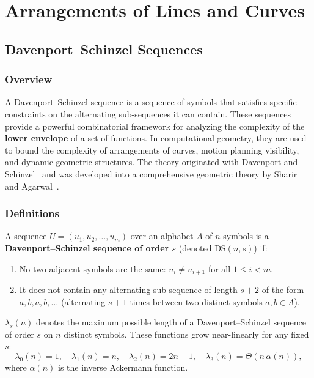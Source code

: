\chapter{Arrangements of Lines and Curves}
\label{ch:envelopes}

\section{Davenport--Schinzel Sequences}
\label{sec:davenport_schinzel}

\subsection{Overview}
A Davenport--Schinzel sequence is a sequence of symbols that satisfies specific constraints on the alternating sub-sequences it can contain. These sequences provide a powerful combinatorial framework for analyzing the complexity of the \textbf{lower envelope} of a set of functions. In computational geometry, they are used to bound the complexity of arrangements of curves, motion planning visibility, and dynamic geometric structures. The theory originated with Davenport and Schinzel~\cite{davenport1965} and was developed into a comprehensive geometric theory by Sharir and Agarwal~\cite{sharir1995}.

\subsection{Definitions}

\begin{definition}\label{def:ds_sequence}
A sequence $U = (u_1, u_2, \dots, u_m)$ over an alphabet $A$ of $n$ symbols is a \textbf{Davenport--Schinzel sequence of order $s$} (denoted $\text{DS}(n,s)$) if:
\begin{enumerate}
    \item No two adjacent symbols are the same: $u_i \neq u_{i+1}$ for all $1 \leq i < m$.
    \item It does not contain any alternating sub-sequence of length $s+2$ of the form $a, b, a, b, \dots$ (alternating $s+1$ times between two distinct symbols $a, b \in A$).
\end{enumerate}
\end{definition}

\begin{definition}[$\lambda_s(n)$]\label{def:lambda_s}
$\lambda_s(n)$ denotes the maximum possible length of a Davenport--Schinzel sequence of order $s$ on $n$ distinct symbols. These functions grow near-linearly for any fixed $s$:
\[
\lambda_0(n) = 1, \quad \lambda_1(n) = n, \quad \lambda_2(n) = 2n - 1, \quad \lambda_3(n) = \Theta(n\,\alpha(n)),
\]
where $\alpha(n)$ is the inverse Ackermann function.
\end{definition}

